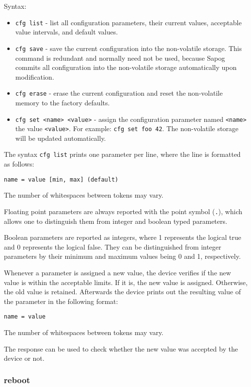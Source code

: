 \documentclass{zubaxdoc}
\begin{document}
	Syntax:
	\begin{itemize}
		\item \verb|cfg list| - list all configuration parameters, their current values,
		acceptable value intervals, and default values.
		
		\item \verb|cfg save| - save the current configuration into the non-volatile storage.
		This command is redundant and normally need not be used, because Sapog commits all configuration
		into the non-volatile storage automatically upon modification.
		
		\item \verb|cfg erase| - erase the current configuration and reset the non-volatile memory to
		the factory defaults.
		
		\item \verb|cfg set <name> <value>| - assign the configuration parameter named \verb|<name>| the value
		\verb|<value>|. For example: \verb|cfg set foo 42|.
		The non-volatile storage will be updated automatically.
	\end{itemize}
	
	The syntax \verb|cfg list| prints one parameter per line, where the line is formatted as follows:
	
	\verb|name = value [min, max] (default)|
	
	The number of whitespaces between tokens may vary.
	
	Floating point parameters are always reported with the point symbol (\verb|.|),
	which allows one to distinguish them from integer and boolean typed parameters.
	
	Boolean parameters are reported as integers, where 1 represents the logical true and
	0 represents the logical false.
	They can be distinguished from integer parameters by their minimum and maximum values being 0 and 1,
	respectively.
	
	Whenever a parameter is assigned a new value, the device verifies if the new value is within the
	acceptable limits.
	If it is, the new value is assigned. Otherwise, the old value is retained.
	Afterwards the device prints out the resulting value of the parameter in the following format:
	
	\verb|name = value|
	
	The number of whitespaces between tokens may vary.
	
	The response can be used to check whether the new value was accepted by the device or not.
	
	\subsubsection{reboot}
	
\end{document}

